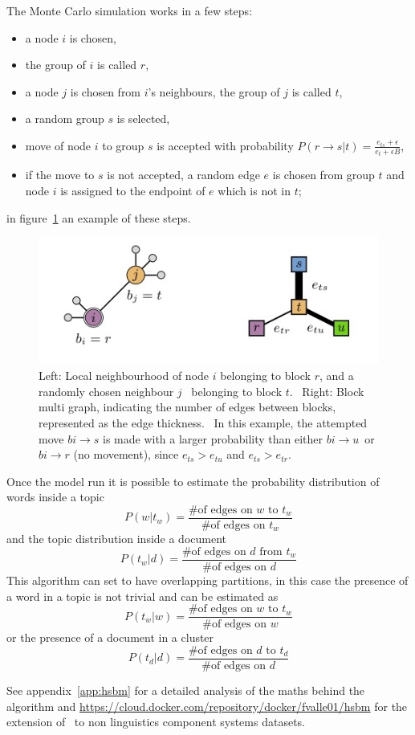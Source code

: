The Monte Carlo simulation works in a few steps:
\begin{itemize}
 \item a node $i$ is chosen,
 \item the group of $i$ is called $r$,
  \item a node $j$ is chosen from $i$'s neighbours, the group of $j$ is called $t$,
  \item a random group $s$ is selected,
  \item move of node $i$ to group $s$ is accepted with probability $P(r\to s|t)=\frac{e_{ts}+\epsilon}{e_t+\epsilon B}$,
  \item if the move to $s$ is not accepted, a random edge $e$ is chosen from group $t$ and node $i$ is assigned to the endpoint of $e$ which is not in $t$;
\end{itemize}
in figure~\ref{fig:topic_peixioto_move} an example of these steps.
\begin{figure}[htb!]
  \centering
  \includegraphics[width=0.9\linewidth]{pictures/topic/peixioto_move.jpg}
  \caption{Left: Local neighbourhood of node $i$ belonging to block $r$, and a randomly chosen neighbour $j$ \
  belonging to block $t$. \
  Right: Block multi graph, indicating the number of edges between blocks, represented as the edge thickness. \
  In this example, the attempted move $bi \to s$ is made with a larger probability than either $bi \to u$\
   or $bi \to r$ (no movement), since $e_{ts}>e_{tu}$ and $e_{ts}>e_{tr}$.}
  \label{fig:topic_peixioto_move}
\end{figure}

Once the model run it is possible to estimate the probability distribution of words inside a topic
\[P(w|t_w)=\frac{\text{\# of edges on $w$ to $t_w$}}{\text{\# of edges on $t_w$}}\]
and the topic distribution inside a document
\[P(t_w|d)=\frac{\text{\# of edges on $d$ from $t_w$}}{\text{\# of edges on $d$}}\]
This algorithm can set to have overlapping partitions, in this case the presence of a word in a topic is not trivial and can be estimated as 
\[P(t_w|w)=\frac{\text{\# of edges on $w$ to $t_w$}}{\text{\# of edges on $w$}}\]
or the presence of a document in a cluster
\[P(t_d|d)=\frac{\text{\# of edges on $d$ to $t_d$}}{\text{\# of edges on $d$}}\]

See appendix~\ref{app:hsbm} for a detailed analysis of the maths behind the algorithm and \url{https://cloud.docker.com/repository/docker/fvalle01/hsbm} for the extension of~\cite{gerlach2018network} to non linguistics component systems datasets.
